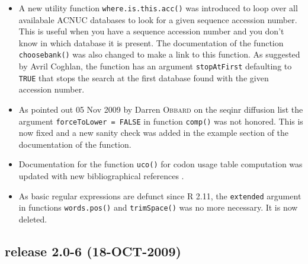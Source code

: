 \documentclass{article}
\begin{document}
\begin{itemize}

\item A new utility function \texttt{where.is.this.acc()} was introduced
to loop over all availabale ACNUC databases to look for
a given sequence accession number. This is useful when you have
a sequence accession number and you don't know in which database
it is present. The documentation of the function \texttt{choosebank()}
was also changed to make a link to this function. As suggested by
Avril Coghlan, the function has an argument \texttt{stopAtFirst} defaulting
to \texttt{TRUE} that stops the search at the first database found
with the given accession number.

\item As pointed out 05 Nov 2009 by Darren \textsc{Obbard} on the seqinr diffusion list the argument \texttt{forceToLower = FALSE} in function \texttt{comp()} was not honored. This is now fixed and a new sanity check was added in the example section of the documentation of the function.

\item Documentation for the function \texttt{uco()} for codon usage table computation was updated with new bibliographical references \cite{lobrychessel, SuzukiH2008}.

\item As basic regular expressions are defunct since R 2.11, the
\texttt{extended} argument in functions \texttt{words.pos()} and
\texttt{trimSpace()} was no more necessary. It is now deleted.

\end{itemize}

\subsection*{release 2.0-6 (18-OCT-2009)}
\end{document}
